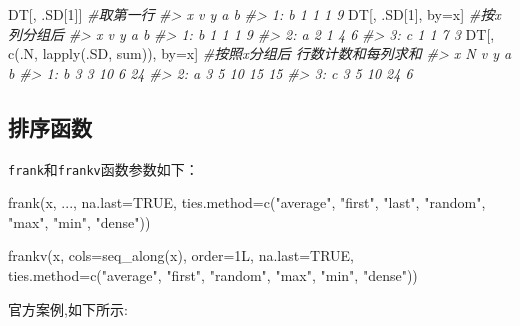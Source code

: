 \documentclass[
]{book}
\newenvironment{Shaded}{\begin{snugshade}}{\end{snugshade}}
\newcommand{\AttributeTok}[1]{\textcolor[rgb]{0.77,0.63,0.00}{#1}}
\newcommand{\CommentTok}[1]{\textcolor[rgb]{0.56,0.35,0.01}{\textit{#1}}}
\newcommand{\ConstantTok}[1]{\textcolor[rgb]{0.00,0.00,0.00}{#1}}
\newcommand{\DecValTok}[1]{\textcolor[rgb]{0.00,0.00,0.81}{#1}}
\newcommand{\FunctionTok}[1]{\textcolor[rgb]{0.00,0.00,0.00}{#1}}
\newcommand{\NormalTok}[1]{#1}
\newcommand{\OtherTok}[1]{\textcolor[rgb]{0.56,0.35,0.01}{#1}}
\newcommand{\StringTok}[1]{\textcolor[rgb]{0.31,0.60,0.02}{#1}}
\begin{document}
\begin{Shaded}
\begin{Highlighting}[]
\NormalTok{DT[, .SD[}\DecValTok{1}\NormalTok{]] }\CommentTok{\#取第一行}
\CommentTok{\#\textgreater{}    x v y a b}
\CommentTok{\#\textgreater{} 1: b 1 1 1 9}
\NormalTok{DT[, .SD[}\DecValTok{1}\NormalTok{], by}\OtherTok{=}\NormalTok{x] }\CommentTok{\#按x列分组后}
\CommentTok{\#\textgreater{}    x v y a b}
\CommentTok{\#\textgreater{} 1: b 1 1 1 9}
\CommentTok{\#\textgreater{} 2: a 2 1 4 6}
\CommentTok{\#\textgreater{} 3: c 1 1 7 3}
\NormalTok{DT[, }\FunctionTok{c}\NormalTok{(.N, }\FunctionTok{lapply}\NormalTok{(.SD, sum)), by}\OtherTok{=}\NormalTok{x] }\CommentTok{\#按照x分组后 行数计数和每列求和}
\CommentTok{\#\textgreater{}    x N v  y  a  b}
\CommentTok{\#\textgreater{} 1: b 3 3 10  6 24}
\CommentTok{\#\textgreater{} 2: a 3 5 10 15 15}
\CommentTok{\#\textgreater{} 3: c 3 5 10 24  6}
\end{Highlighting}
\end{Shaded}

\hypertarget{ux6392ux5e8fux51fdux6570}{%
\subsection{排序函数}\label{ux6392ux5e8fux51fdux6570}}

\texttt{frank}和\texttt{frankv}函数参数如下：

\begin{Shaded}
\begin{Highlighting}[]
\FunctionTok{frank}\NormalTok{(x, ..., }\AttributeTok{na.last=}\ConstantTok{TRUE}\NormalTok{, }\AttributeTok{ties.method=}\FunctionTok{c}\NormalTok{(}\StringTok{"average"}\NormalTok{,}
  \StringTok{"first"}\NormalTok{, }\StringTok{"last"}\NormalTok{, }\StringTok{"random"}\NormalTok{, }\StringTok{"max"}\NormalTok{, }\StringTok{"min"}\NormalTok{, }\StringTok{"dense"}\NormalTok{))}

\FunctionTok{frankv}\NormalTok{(x, }\AttributeTok{cols=}\FunctionTok{seq\_along}\NormalTok{(x), }\AttributeTok{order=}\NormalTok{1L, }\AttributeTok{na.last=}\ConstantTok{TRUE}\NormalTok{,}
      \AttributeTok{ties.method=}\FunctionTok{c}\NormalTok{(}\StringTok{"average"}\NormalTok{, }\StringTok{"first"}\NormalTok{, }\StringTok{"random"}\NormalTok{,}
        \StringTok{"max"}\NormalTok{, }\StringTok{"min"}\NormalTok{, }\StringTok{"dense"}\NormalTok{))}
\end{Highlighting}
\end{Shaded}

官方案例,如下所示:
\end{document}

